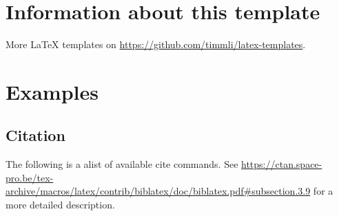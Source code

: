\section{Information about this template}

More \LaTeX{} templates on \url{https://github.com/timmli/latex-templates}.

\section{Examples}

\subsection{Citation}

The following is a alist of available cite commands. See \url{https://ctan.space-pro.be/tex-archive/macros/latex/contrib/biblatex/doc/biblatex.pdf#subsection.3.9} for a more detailed description.


